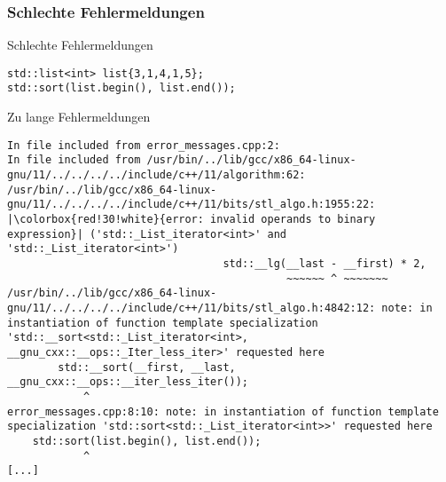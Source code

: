 \subsubsection{Schlechte Fehlermeldungen}

\begin{frame}[fragile]{Schlechte Fehlermeldungen}

    \begin{verbatim}
std::list<int> list{3,1,4,1,5};
std::sort(list.begin(), list.end());
    \end{verbatim}
\end{frame}

\setlength{\fboxsep}{0.1pt}
\begin{frame}[fragile]{Zu lange Fehlermeldungen}
    \begin{verbatim}
In file included from error_messages.cpp:2:
In file included from /usr/bin/../lib/gcc/x86_64-linux-gnu/11/../../../../include/c++/11/algorithm:62:
/usr/bin/../lib/gcc/x86_64-linux-gnu/11/../../../../include/c++/11/bits/stl_algo.h:1955:22:
|\colorbox{red!30!white}{error: invalid operands to binary expression}| ('std::_List_iterator<int>' and 'std::_List_iterator<int>')
                                  std::__lg(__last - __first) * 2,
                                            ~~~~~~ ^ ~~~~~~~
/usr/bin/../lib/gcc/x86_64-linux-gnu/11/../../../../include/c++/11/bits/stl_algo.h:4842:12: note: in instantiation of function template specialization 'std::__sort<std::_List_iterator<int>, __gnu_cxx::__ops::_Iter_less_iter>' requested here
        std::__sort(__first, __last, __gnu_cxx::__ops::__iter_less_iter());
            ^
error_messages.cpp:8:10: note: in instantiation of function template specialization 'std::sort<std::_List_iterator<int>>' requested here
    std::sort(list.begin(), list.end());
            ^
[...]
\end{verbatim}

\end{frame}
